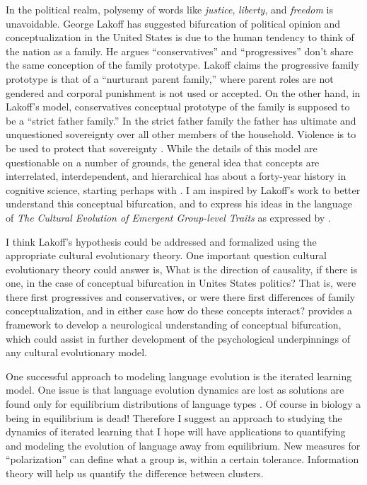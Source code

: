 \documentclass[11pt,letterpaper]{article}
\begin{document}
In the political realm, polysemy of words like \emph{justice}, \emph{liberty},
and \emph{freedom} is unavoidable. George Lakoff has suggested 
bifurcation of political opinion and conceptualization in the United States is
due to the
human tendency to think of the nation as a family. He argues ``conservatives''
and ``progressives'' don't share the same conception of the family prototype.
Lakoff claims the progressive family prototype is that of a ``nurturant parent family,''
where parent roles are not gendered and corporal punishment is not used or
accepted. On the other hand, in Lakoff's model, conservatives
conceptual prototype of the family is supposed to be a ``strict father family.''
In the strict father family the father has ultimate and unquestioned 
sovereignty over all other members of the household. Violence is to be used
to protect that sovereignty \cite{Lakoff1996}. 
While the details of this model are questionable
on a number of grounds, the general idea that concepts are interrelated,
interdependent, and hierarchical has about a forty-year history in cognitive
science, starting perhaps with . I am inspired by
Lakoff's work to better understand this conceptual bifurcation, and to 
express his ideas in the language of \textit{The Cultural Evolution of 
Emergent Group-level Traits} as expressed by \cite{Smaldino2014}.

I think Lakoff's hypothesis 
could be addressed and formalized using the appropriate cultural evolutionary theory.
One important question cultural evolutionary theory could answer is,
What is the direction of causality, if there is one, in the case of
conceptual bifurcation in Unites States politics? 
That is, were there first progressives and
conservatives, or were there first differences of family conceptualization, and
in either case how do these concepts interact? 
 provides a framework to 
develop a neurological understanding of conceptual bifurcation, which could
assist in further development of the psychological underpinnings of any 
cultural evolutionary model.

One successful approach to modeling language evolution is the iterated learning
model. One issue is that language evolution dynamics are lost as solutions are
found only for equilibrium distributions of language types \cite{Smith2008}.
Of course in biology a being in equilibrium is dead! Therefore I suggest an 
approach to studying the dynamics of iterated learning that I hope will
have applications to quantifying and modeling the evolution of language away
from equilibrium. New measures for ``polarization'' can define what a group is,
within a certain tolerance. Information theory will help us quantify the difference
between clusters.
\end{document}
